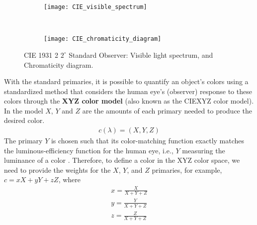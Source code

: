 \begin{figure}[!ht]
    \centering
    \begin{subfigure}[c]{0.65\textwidth}
        \texttt{[image: CIE\_visible\_spectrum]}
        \caption{}
        \label{fig:visual_spectrum}
    \end{subfigure}\\
    \begin{subfigure}[c]{0.65\textwidth}
        \texttt{[image: CIE\_chromaticity\_diagram]}
        \caption{}
        \label{fig:chrom_diagram}
    \end{subfigure} 
                      
    \caption{CIE 1931 2 $2^\circ$ Standard Observer:  Visible light spectrum, and  Chromaticity diagram.}\label{fig:cie_standard_observer}    
\end{figure}

With the standard primaries, it is possible to quantify an object's colors using a standardized method that considers the human eye's (observer) response to these colors through the \textbf{XYZ color model} (also known as the CIEXYZ color model). In the model $X$, $Y$ and $Z$ are the amounts of each primary needed to produce the desired color.
\begin{eqnarray} 
 c(\lambda) = (X,Y,Z) \label{eq:XYZ_color}
\end{eqnarray}
The primary $Y$ is chosen such that its color-matching function exactly matches the luminous-efficiency function for the human eye, i.e., $Y$ measuring the luminance of a color \citep{Wright:BookCh2:2007}. Therefore, to define a color in the  XYZ color space, we need to provide the weights for the $X$, $Y$, and $Z$ primaries, for example, $c =xX + yY + zZ$, where 
\begin{gather} 
	x = \frac{X}{X+Y+Z} \nonumber \\ 
	y = \frac{Y}{X+Y+Z} \label{eq:xyz_color_coords} \\ 
	z = \frac{Z}{X+Y+Z} \nonumber 
\end{gather}


